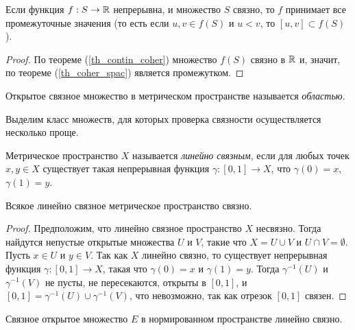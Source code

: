 \begin{corollary}
    Если функция $f: S \to \mathbb{R}$ непрерывна, и множество $S$ связно, то $f$ принимает все промежуточные значения (то есть если $u, v \in f(S)$ и $u < v$, то $[u, v] \subset f(S)$).
\end{corollary}

\begin{proof}
    По теореме (\ref{th_contin_coher}) множество $f(S)$ связно в $\mathbb{R}$ и, значит, по теореме (\ref{th_coher_spac}) является промежутком.
\end{proof}

\begin{definition}
    Открытое связное множество в метрическом пространстве называется \textit{областью}.
\end{definition}

Выделим класс множеств, для которых проверка связности осуществляется несколько проще.

\begin{definition}
    Метрическое пространство $X$ называется \textit{линейно связным}, если для любых точек $x, y \in X$ существует такая непрерывная функция $\gamma: [0, 1] \to X$, что $\gamma(0) = x$, $\gamma(1) = y$.
\end{definition}

\begin{theorem}
    Всякое линейно связное метрическое пространство связно.
\end{theorem}

\begin{proof}
    Предположим, что линейно связное пространство $X$ несвязно. Тогда найдутся непустые открытые множества $U$ и $V$, такие что $X = U \cup V$ и $U \cap V = \emptyset$. Пусть $x \in U$ и $y \in V$. Так как $X$ линейно связно, то существует непрерывная функция $\gamma: [0, 1] \to X$, такая что $\gamma(0) = x$ и $\gamma(1) = y$. Тогда $\gamma^{-1}(U)$ и $\gamma^{-1}(V)$ не пусты, не пересекаются, открыты в $[0, 1]$, и $[0, 1] = \gamma^{-1}(U) \cup \gamma^{-1}(V)$, что невозможно, так как отрезок $[0, 1]$ связен.
\end{proof}

\begin{lemma}
    Связное открытое множество $E$ в нормированном пространстве линейно связно.
\end{lemma}

